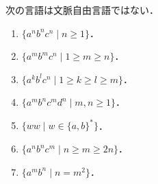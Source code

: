 \begin{corollary}\label{cor-counterexamples-of-CFL}
    次の言語は文脈自由言語ではない．
    \begin{enumerate}
        \item $\{a^nb^nc^n\mid n\ge 1\}$．
        \item $\{a^mb^mc^n\mid 1\ge m\ge n\}$．
        \item $\{a^kb^lc^n\mid 1\ge k\ge l\ge m\}$．
        \item $\{a^mb^nc^md^n\mid m,n\ge 1\}$．
        \item $\{ww\mid w\in\{a,b\}^*\}$．
        \item $\{a^nb^nc^m\mid n\ge m\ge 2n\}$．
        \item $\{a^mb^n\mid n=m^2\}$．
    \end{enumerate}
\end{corollary}
